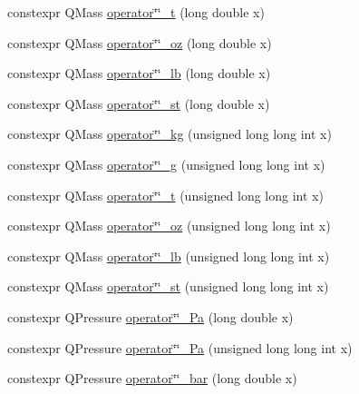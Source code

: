 \begin{DoxyCompactItemize}
\item 
constexpr Q\+Mass \mbox{\hyperlink{namespaceokapi_1_1literals_ac7aced95338b2abd4d667c96cb272b5a}{operator\char`\"{}\char`\"{}\+\_\+t}} (long double x)
\item 
constexpr Q\+Mass \mbox{\hyperlink{namespaceokapi_1_1literals_a8d9009d2400cba754b84e5e6ad9e8aa7}{operator\char`\"{}\char`\"{}\+\_\+oz}} (long double x)
\item 
constexpr Q\+Mass \mbox{\hyperlink{namespaceokapi_1_1literals_a78d921210c09125a5fce9245e0f35d02}{operator\char`\"{}\char`\"{}\+\_\+lb}} (long double x)
\item 
constexpr Q\+Mass \mbox{\hyperlink{namespaceokapi_1_1literals_a54e0f4ad4668efdc68b0ff3350ece027}{operator\char`\"{}\char`\"{}\+\_\+st}} (long double x)
\item 
constexpr Q\+Mass \mbox{\hyperlink{namespaceokapi_1_1literals_aeeac66a4f9103ec59f750da7f8c17286}{operator\char`\"{}\char`\"{}\+\_\+kg}} (unsigned long long int x)
\item 
constexpr Q\+Mass \mbox{\hyperlink{namespaceokapi_1_1literals_a529ed712dda0f43a7ee831cbcf492d1a}{operator\char`\"{}\char`\"{}\+\_\+g}} (unsigned long long int x)
\item 
constexpr Q\+Mass \mbox{\hyperlink{namespaceokapi_1_1literals_a5c8a173b5ef5dad16c7ce8aed95cc373}{operator\char`\"{}\char`\"{}\+\_\+t}} (unsigned long long int x)
\item 
constexpr Q\+Mass \mbox{\hyperlink{namespaceokapi_1_1literals_a080ca78fe17f0bfe78e0a9c1c152aee9}{operator\char`\"{}\char`\"{}\+\_\+oz}} (unsigned long long int x)
\item 
constexpr Q\+Mass \mbox{\hyperlink{namespaceokapi_1_1literals_aecb4217dbd2c589418f179d42e03a0bc}{operator\char`\"{}\char`\"{}\+\_\+lb}} (unsigned long long int x)
\item 
constexpr Q\+Mass \mbox{\hyperlink{namespaceokapi_1_1literals_a62cd539466770bbc45de269c4120021b}{operator\char`\"{}\char`\"{}\+\_\+st}} (unsigned long long int x)
\item 
constexpr Q\+Pressure \mbox{\hyperlink{namespaceokapi_1_1literals_ab89337b3aebf1978915cf59c47690c2b}{operator\char`\"{}\char`\"{}\+\_\+\+Pa}} (long double x)
\item 
constexpr Q\+Pressure \mbox{\hyperlink{namespaceokapi_1_1literals_a7e08cc5723b3fa603130a1c7a48adca5}{operator\char`\"{}\char`\"{}\+\_\+\+Pa}} (unsigned long long int x)
\item 
constexpr Q\+Pressure \mbox{\hyperlink{namespaceokapi_1_1literals_a0c2d73023291966566c98c439789d640}{operator\char`\"{}\char`\"{}\+\_\+bar}} (long double x)

\end{DoxyCompactItemize}
